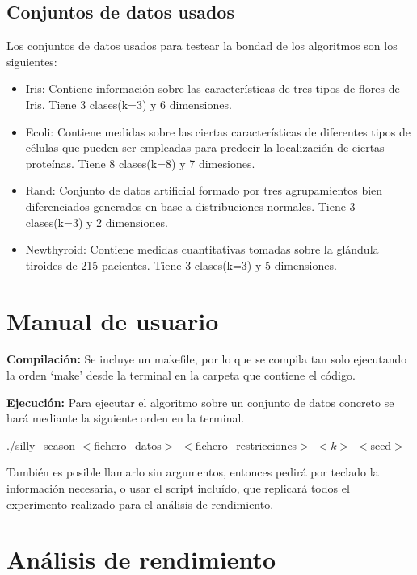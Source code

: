 \documentclass{article}
\begin{document}
	\subsection{Conjuntos de datos usados}
	Los conjuntos de datos usados para testear la bondad de los algoritmos son los siguientes:
	\begin{itemize}
		\item Iris: Contiene información sobre las características de tres tipos de flores de Iris. Tiene 3
		clases(k=3) y 6 dimensiones.
		\item Ecoli: Contiene medidas sobre las ciertas características de diferentes tipos de células que
		pueden ser empleadas para predecir la localización de ciertas proteínas. Tiene 8 clases(k=8)
		y 7 dimesiones.
		\item Rand: Conjunto de datos artificial formado por tres agrupamientos bien diferenciados
		generados en base a distribuciones normales. Tiene 3 clases(k=3) y 2 dimensiones.
		\item Newthyroid: Contiene medidas cuantitativas tomadas sobre la glándula tiroides de 215
		pacientes. Tiene 3 clases(k=3) y 5 dimensiones.
	\end{itemize}
	
	\section{Manual de usuario}
	\textbf{Compilación:} Se incluye un makefile, por lo que se compila tan solo ejecutando la orden ‘make’ desde la terminal en la carpeta que contiene el código.\par
	\textbf{Ejecución:} Para ejecutar el algoritmo sobre un conjunto de datos concreto se hará mediante la siguiente orden en la terminal.\par
	{\centering ./silly\_season $<$fichero\_datos$>$ $<$fichero\_restricciones$>$ $<k>$ $<$seed$>$\par}
	También es posible llamarlo sin argumentos, entonces pedirá por teclado la información necesaria, o usar el script incluído, que replicará todos el experimento realizado para el análisis de rendimiento.
	
	\section{Análisis de rendimiento}
\end{document}
